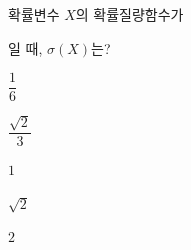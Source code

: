 확률변수 $X$의 확률질량함수가 \par\smallskip{}\par\smallskip\noindent 일 때, $\sigma(X)$는? 
\begin{choices32}{\rule[-3ex]{0pt}{8ex}$\dfrac{1}{6}$}{\rule[-3ex]{0pt}{8ex}$\dfrac{\sqrt{2}}{3}$}{\rule[-3ex]{0pt}{8ex}$1$}{\rule[-3ex]{0pt}{8ex}$\sqrt{2}$}{\rule[-3ex]{0pt}{8ex}$2$}\end{choices32}
